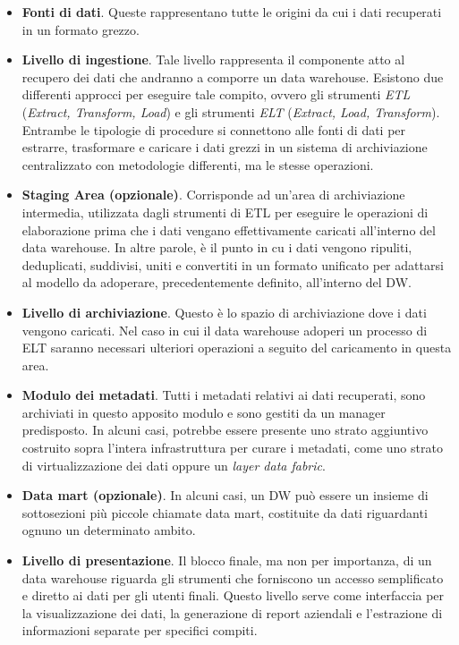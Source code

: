 \begin{itemize}
    \item \textbf{Fonti di dati}. Queste rappresentano tutte le origini da cui i dati recuperati in un formato grezzo.
    \item \textbf{Livello di ingestione}. Tale livello rappresenta il componente atto al recupero dei dati che andranno a comporre un data warehouse. Esistono due differenti approcci per eseguire tale compito, ovvero gli strumenti \textit{ETL} (\textit{Extract, Transform, Load}) e gli strumenti \textit{ELT} (\textit{Extract, Load, Transform}). Entrambe le tipologie di procedure si connettono alle fonti di dati per estrarre, trasformare e caricare i dati grezzi in un sistema di archiviazione centralizzato con metodologie differenti, ma le stesse operazioni.
    \item \textbf{Staging Area (opzionale)}. Corrisponde ad un’area di archiviazione intermedia, utilizzata dagli strumenti di ETL per eseguire le operazioni di elaborazione prima che i dati vengano effettivamente caricati all’interno del data warehouse. In altre parole, è il punto in cu i dati vengono ripuliti, deduplicati, suddivisi, uniti e convertiti in un formato unificato per adattarsi al modello da adoperare, precedentemente definito, all’interno del DW. 
    \item \textbf{Livello di archiviazione}. Questo è lo spazio di archiviazione dove i dati vengono caricati. Nel caso in cui il data warehouse adoperi un processo di ELT saranno necessari ulteriori operazioni a seguito del caricamento in questa area.
    \item \textbf{Modulo dei metadati}. Tutti i metadati relativi ai dati recuperati, sono archiviati in questo apposito modulo e sono gestiti da un manager predisposto. In alcuni casi, potrebbe essere presente uno strato aggiuntivo costruito sopra l’intera infrastruttura per curare i metadati, come uno strato di virtualizzazione dei dati oppure un \textit{layer data fabric}. 
    \item \textbf{Data mart (opzionale)}. In alcuni casi, un DW può essere un insieme di sottosezioni più piccole chiamate data mart, costituite da dati riguardanti ognuno un determinato ambito.
    \item \textbf{Livello di presentazione}. Il blocco finale, ma non per importanza, di un data warehouse riguarda gli strumenti che forniscono un accesso semplificato e diretto ai dati per gli utenti finali. Questo livello serve come interfaccia per la visualizzazione dei dati, la generazione di report aziendali e l’estrazione di informazioni separate per specifici compiti.
\end{itemize}

